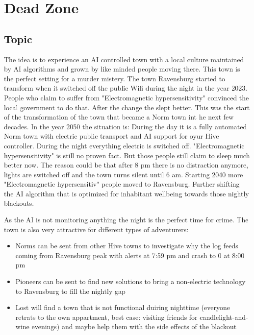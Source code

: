 \chapter{Dead Zone}
\label{ch:dead zone}

\section{Topic}

The idea is to experience an AI controlled town with a local culture maintained by AI algorithms and grown by like minded people moving there. This town is the perfect setting for a murder mistery.
The town Ravensburg started to transform when it switched off the public Wifi during the night in the year 2023. People who claim to suffer from "Electromagnetic hypersensitivity" convinced the local government to do that. After the change the slept better.
This was the start of the transformation of the town that became a Norm town int he next few decades. In the year 2050 the situation is: During the day it is a fully automated Norm town with electric public transport and AI support for oyur Hive controller. During the night everything electric is switched off.
"Electromagnetic hypersensitivity" is still no proven fact. But those people still claim to sleep much better now. The reason could be that after 8 pm there is no distraction anymore, lights are switched off and the town turns silent until 6 am.
Starting 2040 more "Electromagnetic hypersensitiv" people moved to Ravensburg. Further shifting the AI algorithm that is optimized for inhabitant wellbeing towards those nightly blackouts.

As the AI is not monitoring anything the night is the perfect time for crime.
The town is also very attractive for different types of adventurers:

\begin{itemize}
    \item Norms can be sent from other Hive towns to investigate why the log feeds coming from Ravensburg peak with alerts at 7:59 pm and crash to 0 at 8:00 pm
    \item Pioneers can be sent to find new solutions to bring a non-electric technology to Ravensburg to fill the nightly gap
    \item Lost will find a town that is not functional duiring nighttime (everyone retrats to the own appartment, best case: visiting friends for candlelight-and-wine evenings) and maybe help them with the side effects of the blackout
\end{itemize}

